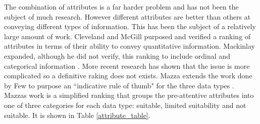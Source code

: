 \documentclass[a4paper, 11pt, titlepage, onehalfspacing]{report}
\begin{document}
The combination of attributes is a far harder problem and has not been the subject of much research. However different attributes are better than others at conveying different types of information. This has been the subject of a relatively large amount of work. Cleveland and McGill purposed and verified a ranking of attributes in terms of their ability to convey quantitative information. Mackinlay expanded, although he did not verify, this ranking to include ordinal and categorical information \cite{mackinlay1986automating}. More recent research has shown that the issue is more complicated \cite{spence2001information} so a definitive raking does not exists. Mazza extends the work done by Few \cite{few2004show} to purpose an ``indicative rule of thumb" for the three data types \cite{mazza2009introduction}. Mazzas work is a simplified ranking that groups the pre-attentive attributes into one of three categories for each data type: suitable, limited suitability and not suitable. It is shown in Table \ref{attribute_table}.
\end{document}
